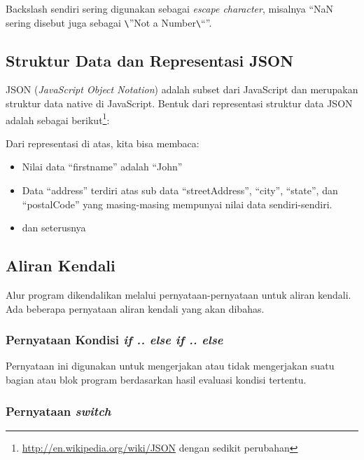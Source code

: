 Backslash sendiri sering digunakan sebagai \textit{escape character}, misalnya ``NaN sering disebut juga sebagai \verb+\+''Not a Number\verb+\+``''.

\subsection{Struktur Data dan Representasi JSON}

JSON (\textit{JavaScript Object Notation}) adalah subset dari JavaScript dan merupakan struktur data native di JavaScript. Bentuk dari representasi struktur data JSON adalah sebagai berikut\footnote{\url{http://en.wikipedia.org/wiki/JSON} dengan sedikit perubahan}:



Dari representasi di atas, kita bisa membaca:
\begin{itemize}
  \item Nilai data ``firstname'' adalah ``John''
  \item Data ``address'' terdiri atas sub data ``streetAddress'', ``city'', ``state'', dan ``postalCode'' yang masing-masing mempunyai nilai data sendiri-sendiri.
  \item dan seterusnya
\end{itemize}

\subsection{Aliran Kendali}

Alur program dikendalikan melalui pernyataan-pernyataan untuk aliran kendali. Ada beberapa pernyataan aliran kendali yang akan dibahas.

\subsubsection{Pernyataan Kondisi \textit{if .. else if .. else}}

Pernyataan ini digunakan untuk mengerjakan atau tidak mengerjakan suatu bagian atau blok program berdasarkan hasil evaluasi kondisi tertentu.



\subsubsection{Pernyataan \textit{switch}}


